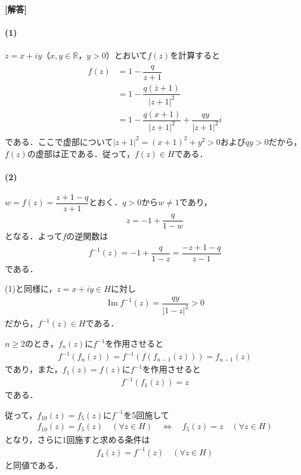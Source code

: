 \documentclass[../../main.tex]{subfiles}
\begin{document}
\begin{oframed}
  
\end{oframed}

{\bf [解答]}

\paragraph{(1)}

$z=x+iy$（$x,y\in\mathbb{R}$，$y>0$）とおいて$f(z)$を計算すると
\begin{align}
  \begin{split}
    f(z)&=1-\dfrac{q}{z+1}\\
    &=1-\dfrac{q(\overline{z}+1)}{|z+1|^2}\\
    &=1-\dfrac{q(x+1)}{|z+1|^2}+\dfrac{qy}{|z+1|^2}i
  \end{split}
\end{align}
である．ここで虚部について$|z+1|^2=(x+1)^2+y^2>0$および$qy>0$だから，$f(z)$の虚部は正である．従って，$f(z)\in H$である．

\paragraph{(2)}

$w=f(z)=\dfrac{z+1-q}{z+1}$とおく．$q>0$から$w\ne1$であり，
\begin{align}
  z=-1+\dfrac{q}{1-w}
\end{align}
となる．よって$f$の逆関数は
\begin{align}
  f^{-1}(z)=-1+\dfrac{q}{1-z}
  =\dfrac{-z+1-q}{z-1}
  \label{eq:1}
\end{align}
である．

(1)と同様に，$z=x+iy\in H$に対し
\begin{align}
  \operatorname{Im} f^{-1}(z)=\dfrac{qy}{|1-z|^2}>0
\end{align}
だから，$f^{-1}(z)\in H$である．

$n\ge2$のとき，$f_n(z)$に$f^{-1}$を作用させると
\begin{align}
  f^{-1}(f_n(z))=f^{-1}(f(f_{n-1}(z)))=f_{n-1}(z) \label{eq:2}
\end{align}
であり，また，$f_1(z)=f(z)$に$f^{-1}$を作用させると
\begin{align}
  f^{-1}(f_1(z))=z \label{eq:3}
\end{align}
である．

従って，$f_{10}(z)=f_5(z)$に$f^{-1}$を5回施して
\begin{align}
  f_{10}(z)=f_5(z)\quad(\forall z\in H)
  \quad\Longleftrightarrow\quad
  f_5(z)=z\quad(\forall z\in H)
\end{align}
となり，さらに1回施すと求める条件は
\begin{align}
  f_4(z)=f^{-1}(z)\quad(\forall z\in H) \label{eq:4}
\end{align}
と同値である．
\end{document}
